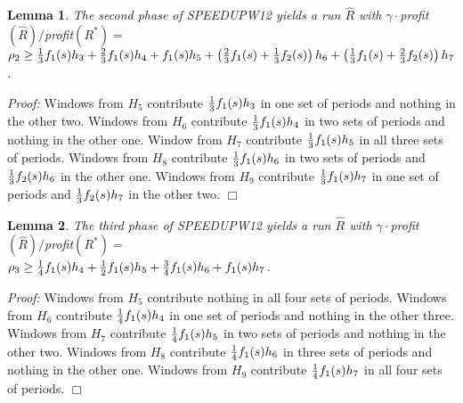\documentclass[11pt]{article}
\newtheorem{lemma}{Lemma}[section]
\newcommand\QED{\ifhmode\allowbreak\else\nobreak\fi
\quad\nobreak$\Box$\medbreak}
\newcommand{\proofstart}{\par\noindent \emph{Proof:} }
\newcommand{\proofend}{\QED\par}
\newenvironment{proof}{\proofstart}{\proofend}
\begin{document}
\begin{lemma}
\label{lemma:phase2}
The second phase of SPEEDUPW12 yields a run $\hat{R}$ with $\gamma\cdot$profit$(\hat{R})/$profit$(R^*) = $\\
\hspace*{.2in}$\rho_2 \geq {1 \over 3}f_1(s)h_3 + {2 \over 3}f_1(s)h_4 + f_1(s)h_5 + \left( {2 \over 3}f_1(s)+{1 \over 3}f_2(s)
\right) h_6 + \left( {1 \over 3}f_1(s)+{2 \over 3}f_2(s)\right) h_7$.
\end{lemma}

\begin{proof}
Windows from $H_5$ contribute ${1 \over 3}f_1(s)h_3$ in one set of periods and nothing in the other two.  Windows from $H_6$ contribute ${1 \over 3}f_1(s)h_4$ in two sets of periods and nothing in the other one.  Window from $H_7$ contribute ${1 \over 3}f_1(s)h_5$ in all three sets of periods.  Windows from $H_8$ contribute ${1 \over 3}f_1(s)h_6$ in two sets of periods and ${1 \over 3}f_2(s)h_6$ in the other one.  Windows from $H_9$ contribute ${1 \over 3}f_1(s)h_7$ in one set of periods and ${1 \over 3}f_2(s)h_7$ in the other two.\end{proof}

\begin{lemma}
\label{lemma:phase3}
The third phase of SPEEDUPW12 yields a run $\hat{R}$ with $\gamma\cdot$profit$(\hat{R})/$profit$(R^*) = $\\
\hspace*{.2in}$\rho_3 \geq {1 \over 4}f_1(s)h_4 + {1 \over 2}f_1(s)h_5 + {3 \over 4}f_1(s)h_6 + f_1(s)h_7$.
\end{lemma}

\begin{proof}
Windows from $H_5$ contribute nothing in all four sets of periods.  Windows from  $H_6$ contribute ${1 \over 4}f_1(s)h_4$ in one set of periods and nothing in the other three.   Windows from $H_7$ contribute ${1 \over 4}f_1(s)h_5$ in two sets of periods and nothing in the other two.  Windows from $H_8$ contribute ${1 \over 4}f_1(s)h_6$ in three sets of periods and nothing in the other one.  Windows from $H_9$ contribute ${1 \over 4}f_1(s)h_7$ in all four sets of periods.\end{proof}
\end{document}
